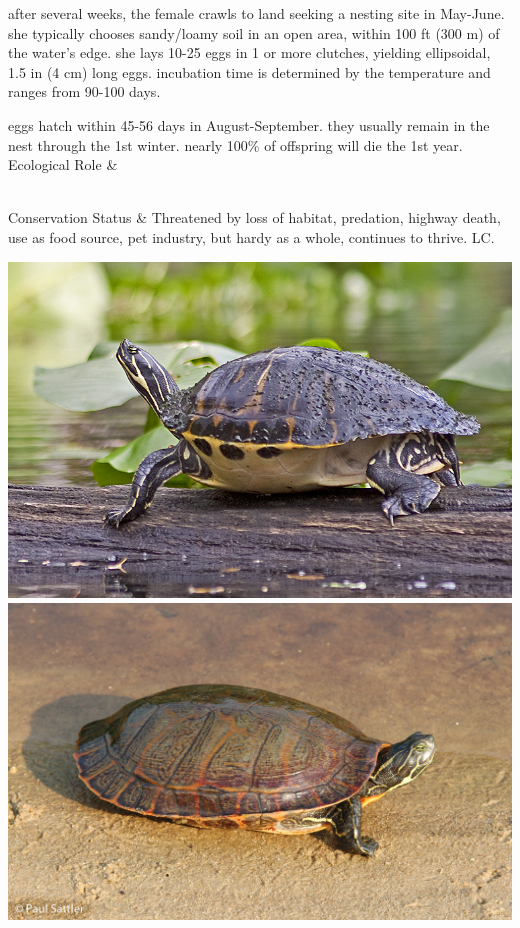 \begin{center}
\begin{longtabu}
	after several weeks, the female crawls to land seeking a nesting site in May-June. she typically chooses sandy/loamy soil in an open area, within 100 ft (300 m) of the water's edge. she lays 10-25 eggs in 1 or more clutches, yielding ellipsoidal, 1.5 in (4 cm) long eggs. incubation time is determined by the temperature and ranges from 90-100 days. 
	
	eggs hatch within 45-56 days in August-September. they usually remain in the nest through the 1st winter. nearly 100\% of offspring will die the 1st year.
	\\
	\hline
	Ecological Role &
	
	\\
	\hline
	Conservation Status & 
	Threatened by loss of habitat, predation, highway death, use as food source, pet industry, but hardy as a whole, continues to thrive. LC.
	\\
	\hline
\end{longtabu}
\includegraphics[scale=0.85]{testudines/emydidae/pseudemys/1}
\includegraphics[scale=0.85]{testudines/emydidae/pseudemys/2}
\end{center}